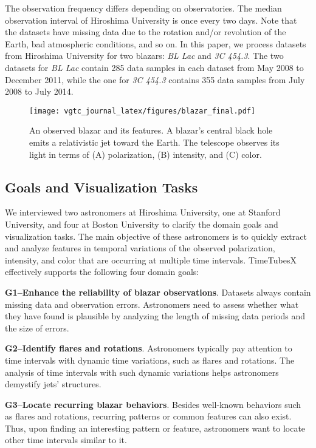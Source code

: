 The observation frequency differs depending on observatories.
The median observation interval of Hiroshima University is once every two days.
Note that the datasets have missing data due to the rotation and/or revolution of the Earth, bad atmospheric conditions, and so on.
In this paper, we process datasets from Hiroshima University for two blazars: \emph{BL Lac} and \emph{3C 454.3}. 
The two datasets for \emph{BL Lac} contain 285 data samples in each dataset from May 2008 to December 2011, while the one for \emph{3C 454.3} contains 355 data samples from July 2008 to July 2014.

\begin{figure}[tb]
    \centering
        \texttt{[image: vgtc\_journal\_latex/figures/blazar\_final.pdf]}
    \caption{An observed blazar and its features. A blazar's central black hole emits a relativistic jet toward the Earth.
        The telescope observes its light in terms of (A) polarization, (B) intensity, and (C) color.}
    \label{fig:blazar}
\end{figure}

\subsection{Goals and Visualization Tasks}\label{sec:domainGoalsandTasks}
We interviewed two astronomers at Hiroshima University, one at Stanford University, and four at Boston University to clarify the domain goals and visualization tasks.
The main objective of these astronomers is 
to quickly extract and analyze features in temporal variations of the observed polarization, intensity, and color that are occurring at multiple time intervals. 
TimeTubesX effectively supports the following four domain goals:

\noindent\textbf{G1--Enhance the reliability of blazar observations}. 
Datasets always contain missing data and observation errors. 
Astronomers need to assess whether what they have found is plausible by analyzing the length of missing data periods and the size of errors.

\noindent\textbf{G2--Identify flares and rotations}. 
Astronomers typically pay attention to time intervals with dynamic time variations,
such as flares and rotations.
The analysis of time intervals with such dynamic variations helps astronomers demystify jets' structures.

\noindent\textbf{G3--Locate recurring blazar behaviors}.
Besides well-known behaviors such as flares and rotations, 
recurring patterns or common features can also exist.
Thus, upon finding an interesting pattern or feature, 
astronomers want to locate other time intervals similar to it.

